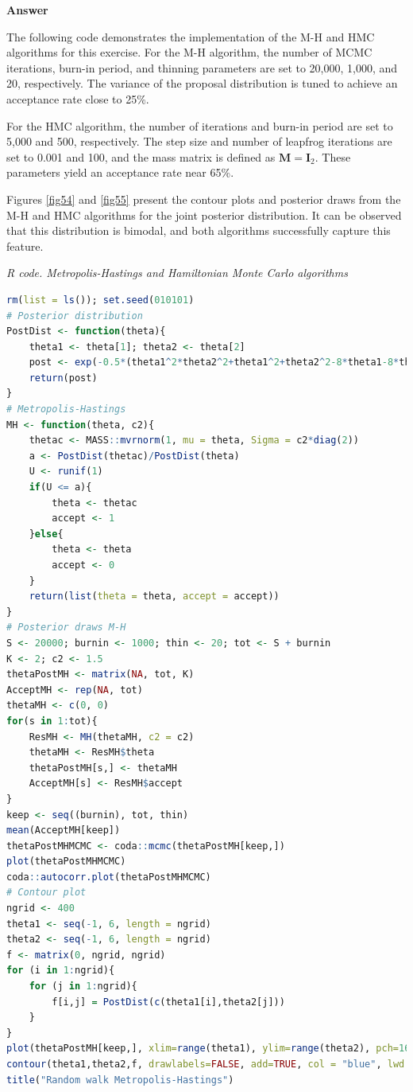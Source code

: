 \begin{enumerate}[leftmargin=*]
  \textbf{Answer}
  
  The following code demonstrates the implementation of the M-H and HMC algorithms for this exercise. For the M-H algorithm, the number of MCMC iterations, burn-in period, and thinning parameters are set to 20,000, 1,000, and 20, respectively. The variance of the proposal distribution is tuned to achieve an acceptance rate close to 25\%. 
  
  For the HMC algorithm, the number of iterations and burn-in period are set to 5,000 and 500, respectively. The step size and number of leapfrog iterations are set to 0.001 and 100, and the mass matrix is defined as \(\bm{M} = \bm{I}_2\). These parameters yield an acceptance rate near 65\%.
  
  Figures \ref{fig54} and \ref{fig55} present the contour plots and posterior draws from the M-H and HMC algorithms for the joint posterior distribution. It can be observed that this distribution is bimodal, and both algorithms successfully capture this feature.
  
 \begin{tcolorbox}[enhanced,width=4.67in,center upper,
 	fontupper=\large\bfseries,drop shadow southwest,sharp corners]
 	\textit{R code. Metropolis-Hastings and Hamiltonian Monte Carlo algorithms}
 	\begin{VF}
 		\begin{lstlisting}[language=R]
rm(list = ls()); set.seed(010101)
# Posterior distribution
PostDist <- function(theta){
	theta1 <- theta[1]; theta2 <- theta[2]
	post <- exp(-0.5*(theta1^2*theta2^2+theta1^2+theta2^2-8*theta1-8*theta2))
	return(post)
}
# Metropolis-Hastings
MH <- function(theta, c2){
	thetac <- MASS::mvrnorm(1, mu = theta, Sigma = c2*diag(2))
	a <- PostDist(thetac)/PostDist(theta)
	U <- runif(1)
	if(U <= a){
		theta <- thetac
		accept <- 1
	}else{
		theta <- theta
		accept <- 0
	}
	return(list(theta = theta, accept = accept))
}
# Posterior draws M-H
S <- 20000; burnin <- 1000; thin <- 20; tot <- S + burnin
K <- 2; c2 <- 1.5
thetaPostMH <- matrix(NA, tot, K)
AcceptMH <- rep(NA, tot)
thetaMH <- c(0, 0)
for(s in 1:tot){
	ResMH <- MH(thetaMH, c2 = c2)
	thetaMH <- ResMH$theta
	thetaPostMH[s,] <- thetaMH
	AcceptMH[s] <- ResMH$accept
}
keep <- seq((burnin), tot, thin)
mean(AcceptMH[keep])
thetaPostMHMCMC <- coda::mcmc(thetaPostMH[keep,])
plot(thetaPostMHMCMC)
coda::autocorr.plot(thetaPostMHMCMC)
# Contour plot
ngrid <- 400
theta1 <- seq(-1, 6, length = ngrid)
theta2 <- seq(-1, 6, length = ngrid)
f <- matrix(0, ngrid, ngrid)
for (i in 1:ngrid){
	for (j in 1:ngrid){
		f[i,j] = PostDist(c(theta1[i],theta2[j]))
	}
}
plot(thetaPostMH[keep,], xlim=range(theta1), ylim=range(theta2), pch=16, col=grey(0.8), xlab=expression(theta[1]), ylab=expression(theta[2]))
contour(theta1,theta2,f, drawlabels=FALSE, add=TRUE, col = "blue", lwd = 1.2)
title("Random walk Metropolis-Hastings")
\end{lstlisting}
 	\end{VF}
 \end{tcolorbox} 


\end{enumerate}
